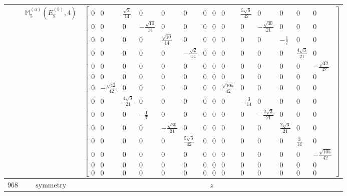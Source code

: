 \documentclass[fleqn,8pt,landscape]{jsarticle}
\begin{document}
\begin{longtable}{ccc}
$  $ & $ \mathbb{M}_{5}^{(a)}(E_{g}^{(b)},4) $ & $ \begin{bmatrix} 0 & 0 & \frac{\sqrt{2}}{14} & 0 & 0 & 0 & 0 & 0 & 0 & \frac{5 \sqrt{6}}{42} & 0 & 0 & 0 & 0 \\ 0 & 0 & 0 & - \frac{\sqrt{10}}{14} & 0 & 0 & 0 & 0 & 0 & 0 & - \frac{\sqrt{30}}{21} & 0 & 0 & 0 \\ 0 & 0 & 0 & 0 & \frac{\sqrt{10}}{14} & 0 & 0 & 0 & 0 & 0 & 0 & - \frac{1}{7} & 0 & 0 \\ 0 & 0 & 0 & 0 & 0 & - \frac{\sqrt{2}}{14} & 0 & 0 & 0 & 0 & 0 & 0 & \frac{4 \sqrt{3}}{21} & 0 \\ 0 & 0 & 0 & 0 & 0 & 0 & 0 & 0 & 0 & 0 & 0 & 0 & 0 & - \frac{\sqrt{42}}{42} \\ 0 & 0 & 0 & 0 & 0 & 0 & 0 & 0 & 0 & 0 & 0 & 0 & 0 & 0 \\ 0 & - \frac{\sqrt{42}}{42} & 0 & 0 & 0 & 0 & 0 & 0 & \frac{\sqrt{105}}{42} & 0 & 0 & 0 & 0 & 0 \\ 0 & 0 & \frac{4 \sqrt{3}}{21} & 0 & 0 & 0 & 0 & 0 & 0 & - \frac{3}{14} & 0 & 0 & 0 & 0 \\ 0 & 0 & 0 & - \frac{1}{7} & 0 & 0 & 0 & 0 & 0 & 0 & - \frac{2 \sqrt{3}}{21} & 0 & 0 & 0 \\ 0 & 0 & 0 & 0 & - \frac{\sqrt{30}}{21} & 0 & 0 & 0 & 0 & 0 & 0 & \frac{2 \sqrt{3}}{21} & 0 & 0 \\ 0 & 0 & 0 & 0 & 0 & \frac{5 \sqrt{6}}{42} & 0 & 0 & 0 & 0 & 0 & 0 & \frac{3}{14} & 0 \\ 0 & 0 & 0 & 0 & 0 & 0 & 0 & 0 & 0 & 0 & 0 & 0 & 0 & - \frac{\sqrt{105}}{42} \\ 0 & 0 & 0 & 0 & 0 & 0 & 0 & 0 & 0 & 0 & 0 & 0 & 0 & 0 \\ 0 & 0 & 0 & 0 & 0 & 0 & 0 & 0 & 0 & 0 & 0 & 0 & 0 & 0 \end{bmatrix} $ \\ \hline
$ 968 $ & $ \text{symmetry} $ & $ z $ \\

\end{longtable}
\end{document}
